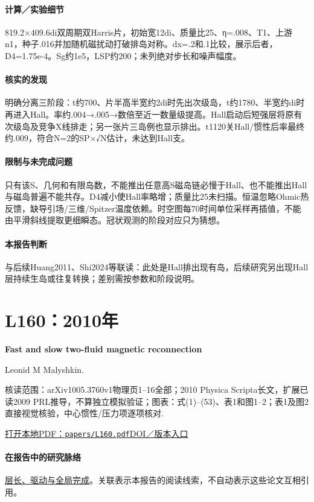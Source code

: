 \paragraph{计算／实验细节}819.2×409.6di双周期双Harris片，初始宽12di、质量比25、η=.008、T1、上游n1，种子.016并加随机磁扰动打破排岛对称。dx=.2和.1比较，展示后者，D4=1.75e-4。Sg约1e5，LSP约200；未列绝对步长和噪声幅度。

\paragraph{核实的发现}明确分离三阶段：t约700、片半高半宽约2di时先出次级岛，t约1780、半宽约di时再进入Hall。率约.004→.005→数倍至近一数量级提高。Hall启动后短强层将原有次级岛及竞争X线排走；另一张片三岛例也显示排出。t1120关Hall/惯性后率最终约.009，符合N=2的SP×√N估计，未达到Hall支。

\paragraph{限制与未完成问题}只有该S、几何和有限岛数，不能推出任意高S磁岛链必慢于Hall、也不能推出Hall与磁岛普遍不能共存。D4减小使Hall率略增；质量比25未扫描。恒温忽略Ohmic热反馈，缺导引场/三维/Spitzer温度依赖。时空图每70时间单位采样再插值，不能由平滑斜线提取更细瞬态。冠状观测的阶段对应只为猜想。

\paragraph{本报告判断}与后续Huang2011、Shi2024等联读：此处是Hall排出现有岛，后续研究另出现Hall层持续生岛或往复转换；差别需按参数和阶段说明。

\section{L160：2010年}\label{paper:L160}

\textbf{Fast and slow two-fluid magnetic reconnection}\citep{L160}\

Leonid M Malyshkin.

\textsf{核读范围：}arXiv1005.3760v1物理页1–16全部；2010 Physica Scripta长文，扩展已读2009 PRL推导，不算独立模拟验证；\textsf{图表：}式(1)–(53)、表1和图1–2；表1及图2直接视觉核验，中心惯性/压力项逐项核对.

\href{run:papers/L160.pdf}{打开本地PDF：\texttt{papers/L160.pdf}}\quad\href{https://doi.org/10.1088/0031-8949/2010/t142/014033}{DOI／版本入口}

\paragraph{在报告中的研究脉络}\hyperref[story:global]{层长、驱动与全局完成}。关联表示本报告的阅读线索，不自动表示这些论文互相引用。

